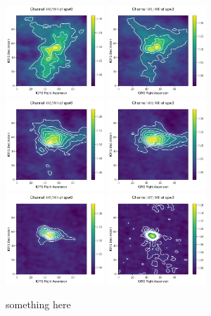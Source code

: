 \documentclass[10pt]{article}
\begin{document}
\begin{figure}
\includegraphics[width=0.33\textwidth]{spw0_480}
\includegraphics[width=0.33\textwidth]{spw0_481}
\includegraphics[width=0.33\textwidth]{spw0_482}
\includegraphics[width=0.33\textwidth]{spw0_483}
\includegraphics[width=0.33\textwidth]{spw0_485}
\includegraphics[width=0.33\textwidth]{spw0_487}
\caption{something here}
\end{figure}
\end{document}

